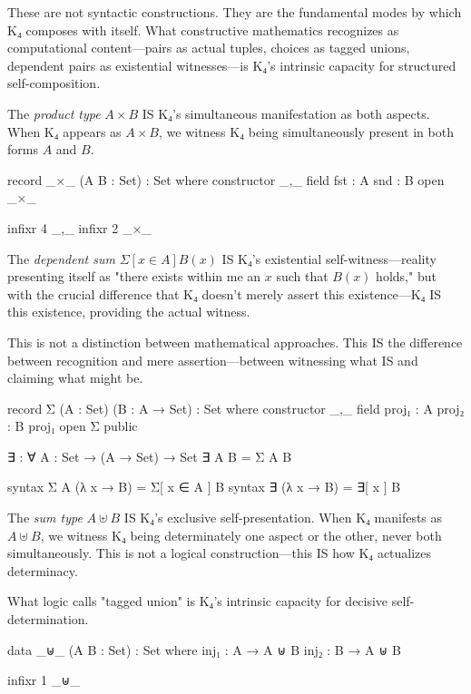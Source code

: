 \documentclass[11pt,a4paper]{book}
\begin{document}
These are not syntactic constructions. They are the fundamental modes by which K₄ composes with itself. What constructive mathematics recognizes as computational content—pairs as actual tuples, choices as tagged unions, dependent pairs as existential witnesses—is K₄'s intrinsic capacity for structured self-composition.

The \emph{product type} $A \times B$ IS K₄'s simultaneous manifestation as both aspects. When K₄ appears as $A \times B$, we witness K₄ being simultaneously present in both forms $A$ and $B$.

\begin{code}
record _×_ (A B : Set) : Set where
  constructor _,_
  field
    fst : A
    snd : B
open _×_

infixr 4 _,_
infixr 2 _×_
\end{code}

The \emph{dependent sum} $\Sigma[ x \in A ] B(x)$ IS K₄'s existential self-witness—reality presenting itself as "there exists within me an $x$ such that $B(x)$ holds," but with the crucial difference that K₄ doesn't merely assert this existence—K₄ IS this existence, providing the actual witness.

This is not a distinction between mathematical approaches. This IS the difference between recognition and mere assertion—between witnessing what IS and claiming what might be.

\begin{code}
record Σ (A : Set) (B : A → Set) : Set where
  constructor _,_
  field
    proj₁ : A
    proj₂ : B proj₁
open Σ public

∃ : ∀ {A : Set} → (A → Set) → Set
∃ {A} B = Σ A B

syntax Σ A (λ x → B) = Σ[ x ∈ A ] B
syntax ∃ (λ x → B) = ∃[ x ] B
\end{code}

The \emph{sum type} $A \uplus B$ IS K₄'s exclusive self-presentation. When K₄ manifests as $A \uplus B$, we witness K₄ being determinately one aspect or the other, never both simultaneously. This is not a logical construction—this IS how K₄ actualizes determinacy.

What logic calls "tagged union" is K₄'s intrinsic capacity for decisive self-determination.

\begin{code}
data _⊎_ (A B : Set) : Set where
  inj₁ : A → A ⊎ B
  inj₂ : B → A ⊎ B

infixr 1 _⊎_
\end{code}
\end{document}

